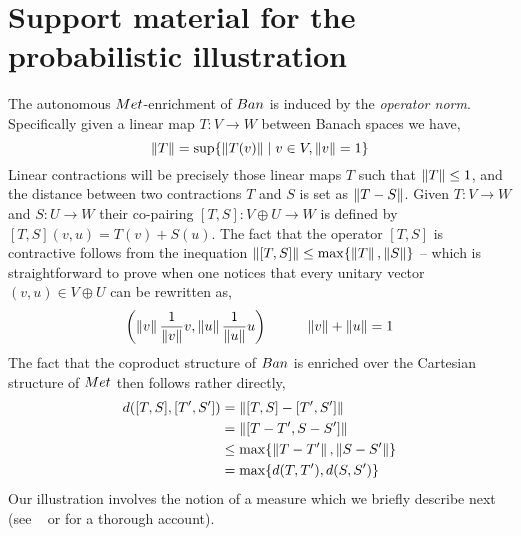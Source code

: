 \documentclass[a4paper,UKenglish,cleveref, autoref, thm-restate]{lipics-v2021}
\begin{document}
\section{Support material for the probabilistic illustration}
\label{sec:back}
The autonomous $\Met$-enrichment of $\Ban$ is induced by the \emph{operator
norm}. Specifically given a linear map $T : V \to W$ between Banach spaces we
have,
\[
        \left\lVert T \right\rVert = \sup \{ \left\lVert T(v) \right\rVert \mid v \in V, \left\lVert v \right\rVert = 1 \}
\]
Linear contractions will be precisely those linear maps $T$ such that $\left\lVert T \right\rVert
\leq 1$, and the distance between two contractions $T$ and $S$ is set as
$\left\lVert  T - S \right\rVert$. Given $T : V \to W$ and $S : U \to W$ their co-pairing $[T,S]
: V \oplus U \to W$ is defined by $[T,S](v,u) = T(v) + S(u)$. The fact that the
operator $[T,S]$ is contractive follows from the inequation $\left\lVert [T,S] \right\rVert \leq
\max \{ \left\lVert T \right\rVert, \left\lVert S \right\rVert \}$ -- which is straightforward to prove when
one notices that every unitary vector $(v,u) \in V \oplus U$ can be rewritten
as,
\[
        \left (\left\lVert v \right\rVert \frac{1}{\left\lVert v \right\rVert} v, \left\lVert u \right\rVert \frac{1}{\left\lVert u \right\rVert} u \right )
        \hspace{1cm}
        \left\lVert v \right\rVert + \left\lVert u \right\rVert = 1
\]
The fact that the coproduct structure of $\Ban$ is enriched over the Cartesian
structure of $\Met$ then follows rather directly,
\begin{align*}
        d([T,S] , [T',S']) 
        & = 
        \left\lVert  [T,S] - [T',S']  \right\rVert
        \\
        & = 
        \left\lVert  [T - T', S - S']  \right\rVert
        \\
        & \leq
        \max \{ \left\lVert T - T' \right\rVert, \left\lVert S - S' \right\rVert \}
        \\
        & =
        \max \{ d(T,T'), d(S,S') \}
\end{align*}
Our illustration involves the notion of a measure which we briefly describe
next  (see \eg\ \cite[Chapter 10]{aliprantis06} or \cite[Chapter
2]{panangaden09} for a thorough account).
\end{document}
